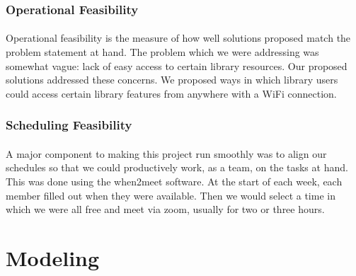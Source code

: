         \subsubsection{Operational Feasibility}
            \paragraph{}
            Operational feasibility is the measure of how well solutions proposed match the problem statement at hand. The problem which we were addressing was somewhat vague: lack of easy access to certain library resources. Our proposed solutions addressed these concerns. We proposed ways in which library users could access certain library features from anywhere with a WiFi connection. 
        \subsubsection{Scheduling Feasibility}
            \paragraph{}
            A major component to making this project run smoothly was to align our schedules so that we could productively work, as a team, on the tasks at hand. This was done using the when2meet software. At the start of each week, each member filled out when they were available. Then we would select a time in which we were all free and meet via zoom, usually for two or three hours. 
    \newpage   
    
   
    \section{Modeling}
    
